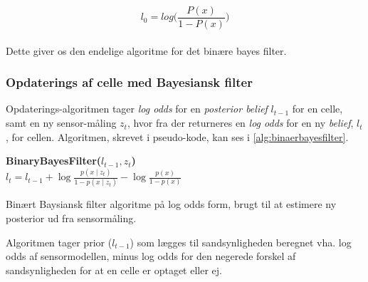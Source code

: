$$ l_0 = log\Bigg(\frac{P(x)}{1-P(x)}\Bigg)$$ 
\cite[s. 96]{probabilisticRobotics} \\

Dette giver os den endelige algoritme for det binære bayes filter.

\subsubsection{Opdaterings af celle med Bayesiansk filter}
Opdaterings-algoritmen tager \textit{log odds} for en \textit{posterior belief} $l_{t-1}$ for en celle, samt en ny sensor-måling $z_t$, hvor fra der returneres en \textit{log odds} for en ny \textit{belief}, $l_t$, for cellen.
Algoritmen, skrevet i pseudo-kode, kan ses i \cref{alg:binaerbayesfilter}.

\begin{algorithm}[h]
\textbf{BinaryBayesFilter($l_{t-1}, z_t$)} \\
\Indp $l_t = l_{t-1} + \log \frac{p(x \mid z_t)}{1-p(x \mid z_t)} - \log \frac{p(x)}{1-p(x)}$ \\
\caption{Binært Baysiansk filter algoritme på log odds form, brugt til at estimere ny posterior ud fra sensormåling.}
\label{alg:binaerbayesfilter}
\end{algorithm}

Algoritmen tager prior ($l_{t-1}$) som lægges til sandsynligheden beregnet vha. log odds af sensormodellen, minus log odds for den negerede forskel 
af sandsynligheden for at en celle er optaget eller ej. \\ \\
\cite[s. 94]{probabilisticRobotics}



